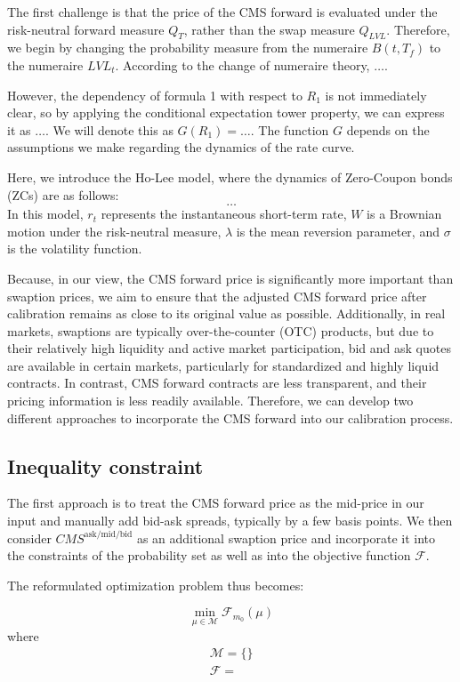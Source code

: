 The first challenge is that the price of the CMS forward is evaluated under the risk-neutral forward measure \(Q_{T}\), 
rather than the swap measure \(Q_{LVL}\). Therefore, we begin by changing the probability measure from the numeraire \(B(t, T_f)\) 
to the numeraire \(LVL_t\). According to the change of numeraire theory, \( \ldots \). 

However, the dependency of formula 1 with respect to \(R_1\) is not immediately clear, so by applying the conditional expectation tower 
property, we can express it as \( \ldots \). We will denote this as \(G(R_1) = \ldots \). The function \(G\) depends on the assumptions we 
make regarding the dynamics of the rate curve.

Here, we introduce the Ho-Lee model, where the dynamics of Zero-Coupon bonds (ZCs) are as follows:
\[ \ldots \]
In this model, \(r_t\) represents the instantaneous short-term rate, \(W\) is a Brownian motion under the risk-neutral measure, \(\lambda\) 
is the mean reversion parameter, and \(\sigma\) is the volatility function.

Because, in our view, the CMS forward price is significantly more important than swaption prices, we aim to ensure that the adjusted CMS 
forward price after calibration remains as close to its original value as possible. Additionally, in real markets, swaptions are typically 
over-the-counter (OTC) products, but due to their relatively high liquidity and active market participation, bid and ask quotes are available 
in certain markets, particularly for standardized and highly liquid contracts. In contrast, CMS forward contracts are less transparent, 
and their pricing information is less readily available. Therefore, we can develop two different approaches to incorporate the CMS forward 
into our calibration process.

\subsection{Inequality constraint} 
The first approach is to treat the CMS forward price as the mid-price in our input and manually add bid-ask spreads, 
typically by a few basis points. We then consider \(CMS^{\text{ask/mid/bid}}\) as an additional swaption price and incorporate 
it into the constraints of the probability set as well as into the objective function \(\mathcal{F}\).

The reformulated optimization problem thus becomes:

\[
\min_{\mu \in \mathcal{M}} \mathcal{F}_{m_0}(\mu) 
\]
where 
\begin{align*}
    \mathcal{M} = \{ \} \\
    \mathcal{F} = 
\end{align*}

